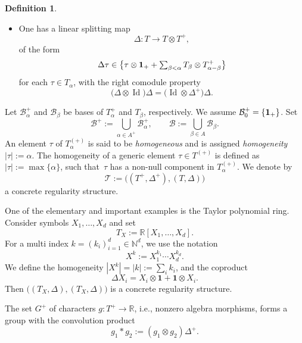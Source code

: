 \documentclass[11pt]{article}
\newcommand{\ie}{i.e.,\xspace}
\numberwithin{equation}{section}
\theoremstyle{plain}
\theoremstyle{definition}
\newtheorem*{defn*} {Definition}
\DeclareMathOperator{\iden}{Id}
\newcommand{\unit}{\mathbf{1}}
\newcommand{\bbN}{\mathbb{N}}
\newcommand{\bbR}{\mathbb{R}}
\newcommand{\mcB}{\mathcal{B}}
\begin{document}
\begin{defn*}
\begin{itemize}
\item One has a linear splitting map\vspace*{-3pt}
\[
\Delta : T \to T\otimes T^+,
\]
of the form\vspace*{-3pt}
\begin{equation}
\label{EqDelta}
\Delta \tau \in \bigl\{\tau\otimes {\bf 1}_+ + \textstyle\sum_{\beta<\alpha} T_\beta\otimes T^+_{\alpha-\beta}\bigr\}
\end{equation}
for each $\tau\in T_\alpha$, with the right comodule property\vspace*{-3pt}
\begin{equation*}
\bigl(\Delta\otimes \iden\bigr)\Delta = \bigl(\iden\otimes \Delta^+\bigr)\Delta.
\end{equation*}
\end{itemize}
Let $\mcB_\alpha^+$ and $\mcB_\beta$ be bases of $T_\alpha^+$ and $T_\beta$, respectively. We assume $\mcB_0^+=\{{\bf1}_+\}$. Set\vspace*{-1pt}
\[
\mcB^+ := \bigcup_{\alpha\in A^+} \mcB_\alpha^+, \qquad \mcB := \bigcup_{\beta\in A} \mcB_\beta.
\]
An element $\tau$ of $T_\alpha^{(+)}$ is said to be \emph{homogeneous} and is assigned \emph{{homogeneity}} $|\tau| := \alpha$. The homogeneity of a generic element $\tau\in T^{(+)}$ is defined as $|\tau| := \max\{\alpha\}$, such that~$\tau$ has a non-null component in $T^{(+)}_\alpha$.
We denote by\vspace*{-3pt}
\[
\mathscr{T} := \bigl((T^+,\Delta^+), (T,\Delta)\bigr)
\]
a concrete regularity structure.
\end{defn*}

One of the elementary and important examples is the Taylor polynomial ring. Consider symbols $X_1, \dots, X_d$ and set\vspace*{-3pt}
\[
T_X := \bbR[X_1,\dots, X_d].
\]
For a multi index $k=(k_i)_{i=1}^d\in\bbN^d$, we use the notation\vspace*{-3pt}
\[
X^k := X_1^{k_1}\cdots X_d^{k_d}.
\]
We define the homogeneity $|X^k|=|k|:=\sum_ik_i$, and the coproduct\vspace*{-1pt}
\begin{equation} \label{EqCoproductPolynomials}
\Delta X_i=X_i\otimes\unit+\unit\otimes X_i.
\end{equation}
Then $\bigl((T_X,\Delta),(T_X,\Delta)\bigr)$ is a concrete regularity structure.

The set $G^+$ of characters $g : T^+\to\bbR$, \ie nonzero algebra morphisms, forms a group with the convolution product\vspace*{-3pt}
\[
g_1*g_2:=(g_1\otimes g_2)\Delta^+.
\]
\end{document}

